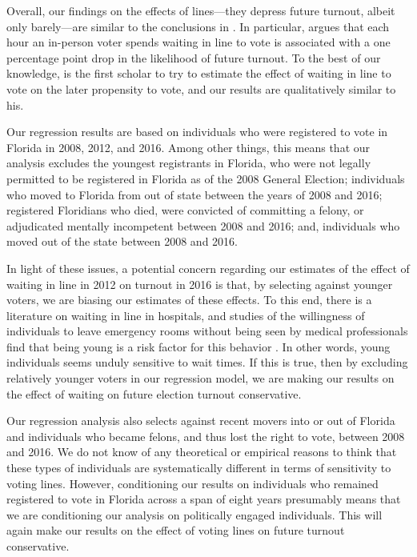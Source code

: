 \documentclass[12pt,titlepage]{article}
\begin{document}
Overall, our findings on the effects of lines---they depress future
turnout, albeit only barely---are similar to the conclusions in
\citet{pettigrew:longlinesminorityprecincts}.  In particular,
\citeauthor{pettigrew:longlinesminorityprecincts} argues that each
hour an in-person voter spends waiting in line to vote is associated
with a one percentage point drop in the likelihood of future turnout.
To the best of our knowledge,
\citeauthor{pettigrew:longlinesminorityprecincts} is the first scholar
to try to estimate the effect of waiting in line to vote on the later
propensity to vote, and our results are qualitatively similar to his.

Our regression results are based on individuals who were registered to
vote in Florida in 2008, 2012, and 2016.  Among other things, this
means that our analysis excludes the youngest registrants in Florida,
who were not legally permitted to be registered in Florida as of the
2008 General Election; individuals who moved to Florida from out of
state between the years of 2008 and 2016; registered Floridians who
died, were convicted of committing a felony, or adjudicated mentally
incompetent between 2008 and 2016; and, individuals who moved out of
the state between 2008 and 2016.

In light of these issues, a potential concern regarding our estimates
of the effect of waiting in line in 2012 on turnout in 2016 is that,
by selecting against younger voters, we are biasing our estimates of
these effects. To this end, there is a literature on waiting in line
in hospitals, and studies of the willingness of individuals to leave
emergency rooms without being seen by medical professionals find that
being young is a risk factor for this behavior
\citep{sunetal:lwbs,clareycooke:emergencyroomleave,shaikh:howlongwaiter}.
In other words, young individuals seems unduly sensitive to wait
times.  If this is true, then by excluding relatively younger voters
in our regression model, we are making our results on the effect of
waiting on future election turnout conservative.

Our regression analysis also selects against recent movers into or out
of Florida and individuals who became felons, and thus lost the right
to vote, between 2008 and 2016.  We do not know of any theoretical or
empirical reasons to think that these types of individuals are
systematically different in terms of sensitivity to voting lines.
However, conditioning our results on individuals who remained
registered to vote in Florida across a span of eight years presumably
means that we are conditioning our analysis on politically engaged
individuals.  This will again make our results on the effect of voting
lines on future turnout conservative.
\end{document}
